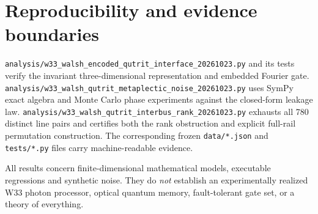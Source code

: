 \documentclass[10pt]{article}
\begin{document}
\section{Reproducibility and evidence boundaries}
\texttt{analysis/w33\_walsh\_encoded\_qutrit\_interface\_20261023.py}
and its tests verify the invariant three-dimensional
representation and embedded Fourier gate.
\texttt{analysis/w33\_walsh\_qutrit\_metaplectic\_noise\_20261023.py}
uses SymPy exact algebra and Monte Carlo phase experiments
against the closed-form leakage law.
\texttt{analysis/w33\_walsh\_qutrit\_interbus\_rank\_20261023.py}
exhausts all 780 distinct line pairs and certifies
both the rank obstruction and explicit full-rail
permutation construction. The corresponding frozen
\texttt{data/*.json} and \texttt{tests/*.py} files
carry machine-readable evidence.

All results concern finite-dimensional mathematical
models, executable regressions and synthetic noise.
They do \emph{not} establish an experimentally
realized W33 photon processor, optical quantum memory,
fault-tolerant gate set, or a theory of everything.
\end{document}
